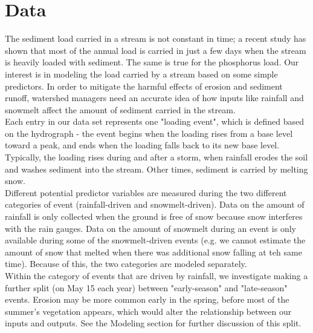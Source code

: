 \section{Data}
The sediment load carried in a stream is not constant in time; a recent study \cite{Danz:2010} has shown that most of the annual load is carried in just a few days when the stream is heavily loaded with sediment. The same is true for the phosphorus load. Our interest is in modeling the load carried by a stream based on some simple predictors. In order to mitigate the harmful effects of erosion and sediment runoff, watershed managers need an accurate idea of how inputs like rainfall and snowmelt affect the amount of sediment carried in the stream.\\

Each entry in our data set represents one "loading event", which is defined based on the hydrograph - the event begins when the loading rises from a base level toward a peak, and ends when the loading falls back to its new base level. Typically, the loading rises during and after a storm, when rainfall erodes the soil and washes sediment into the stream. Other times, sediment is carried by melting snow.\\

Different potential predictor variables are measured during the two different categories of event (rainfall-driven and snowmelt-driven). Data on the amount of rainfall is only collected when the ground is free of snow because snow interferes with the rain gauges. Data on the amount of snowmelt during an event is only available during some of the snowmelt-driven events (e.g. we cannot estimate the amount of snow that melted when there was additional snow falling at teh same time). Because of this, the two categories are modeled separately.\\

Within the category of events that are driven by rainfall, we investigate making a further split (on May 15 each year) between "early-season" and "late-season" events. Erosion may be more common early in the spring, before most of the summer's vegetation appears, which would alter the relationship between our inputs and outputs. See the Modeling section for further discussion of this split.\\